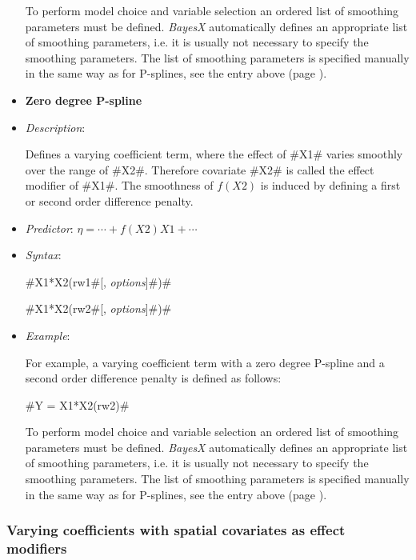 \begin{itemize}
To perform model choice and variable selection an ordered list of smoothing
parameters must be defined. {\em BayesX} automatically defines an appropriate
list of smoothing parameters, i.e. it
is usually not necessary to  specify the smoothing parameters.
The list of smoothing parameters is specified manually in the same way as for P-splines,
see the entry above (page \pageref{psplines_stepwise}).


\item[]{\bf\sffamily Zero degree P-spline}

\item[] {\em Description}:

Defines a varying coefficient term, where the effect of #X1#
varies smoothly over the range of #X2#. Therefore covariate #X2#
is called the effect modifier of #X1#. The smoothness of $f(X2)$ is
induced by defining a first or second order difference penalty.

\item[] {\em Predictor}:
$\eta= \cdots + f(X2)X1 + \cdots$ \item[] {\em Syntax}:

#X1*X2(rw1#[, {\em options}]#)#

#X1*X2(rw2#[, {\em options}]#)#
\item[] {\em Example}:

For example, a varying coefficient term with a zero degree P-spline and a second order difference
penalty is defined as follows:

#Y = X1*X2(rw2)#


To perform model choice and variable selection an ordered list of smoothing parameters must be defined. {\em BayesX} automatically defines an appropriate list of smoothing
parameters, i.e. it is usually not necessary to  specify the smoothing parameters. The list of smoothing parameters is
specified manually in the same way as for P-splines, see the entry above (page \pageref{psplines_stepwise}).

\end{itemize}

\subsubsection*{ Varying coefficients with spatial covariates as
effect modifiers}

